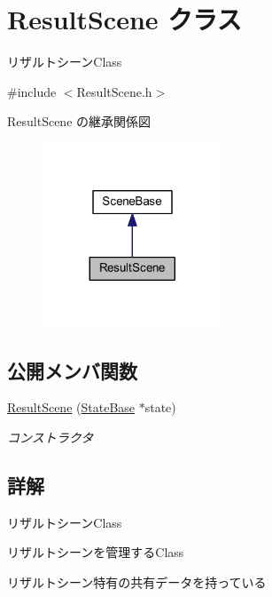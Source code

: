 \hypertarget{class_result_scene}{}\section{Result\+Scene クラス}
\label{class_result_scene}


リザルトシーン\+Class  




{\ttfamily \#include $<$Result\+Scene.\+h$>$}



Result\+Scene の継承関係図\nopagebreak
\begin{figure}[H]
\begin{center}
\leavevmode
\includegraphics[width=152pt]{class_result_scene__inherit__graph}
\end{center}
\end{figure}
\subsection*{公開メンバ関数}
\begin{DoxyCompactItemize}
\item 
\mbox{\hyperlink{class_result_scene_ac184d41a92125eda200a132fe7aadd2e}{Result\+Scene}} (\mbox{\hyperlink{class_scene_base_1_1_state_base}{State\+Base}} $\ast$state)
\begin{DoxyCompactList}\small\item\em コンストラクタ \end{DoxyCompactList}\end{DoxyCompactItemize}


\subsection{詳解}
リザルトシーン\+Class 

リザルトシーンを管理する\+Class

リザルトシーン特有の共有データを持っている 

